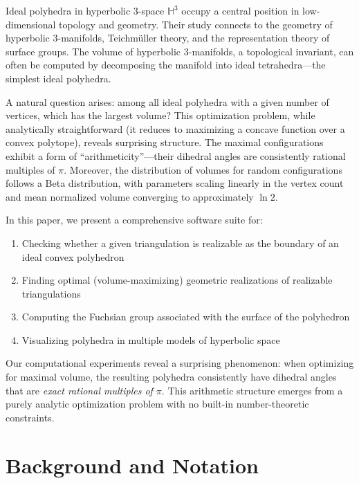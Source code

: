 \documentclass[11pt]{article}
\begin{document}
Ideal polyhedra in hyperbolic 3-space $\mathbb{H}^3$ occupy a central position in low-dimensional topology and geometry. Their study connects to the geometry of hyperbolic 3-manifolds, Teichmüller theory, and the representation theory of surface groups. The volume of hyperbolic 3-manifolds, a topological invariant, can often be computed by decomposing the manifold into ideal tetrahedra---the simplest ideal polyhedra.

A natural question arises: among all ideal polyhedra with a given number of vertices, which has the largest volume? This optimization problem, while analytically straightforward (it reduces to maximizing a concave function over a convex polytope), reveals surprising structure. The maximal configurations exhibit a form of ``arithmeticity''---their dihedral angles are consistently rational multiples of $\pi$. Moreover, the distribution of volumes for random configurations follows a Beta distribution, with parameters scaling linearly in the vertex count and mean normalized volume converging to approximately $\ln 2$.

In this paper, we present a comprehensive software suite for:
\begin{enumerate}[label=(\roman*)]
    \item Checking whether a given triangulation is realizable as the boundary of an ideal convex polyhedron
    \item Finding optimal (volume-maximizing) geometric realizations of realizable triangulations
    \item Computing the Fuchsian group associated with the surface of the polyhedron
    \item Visualizing polyhedra in multiple models of hyperbolic space
\end{enumerate}

Our computational experiments reveal a surprising phenomenon: when optimizing for maximal volume, the resulting polyhedra consistently have dihedral angles that are \emph{exact rational multiples of $\pi$}. This arithmetic structure emerges from a purely analytic optimization problem with no built-in number-theoretic constraints.

\section{Background and Notation}
\end{document}

